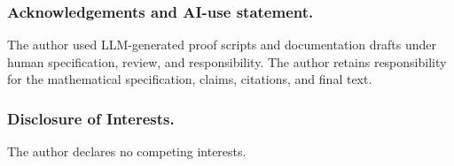 \documentclass[runningheads]{llncs}
\begin{document}
\subsubsection*{Acknowledgements and AI-use statement.}

The author used LLM-generated proof scripts and documentation drafts under
human specification, review, and responsibility. The author retains
responsibility for the mathematical specification, claims, citations, and
final text.

\subsubsection*{Disclosure of Interests.}

The author declares no competing interests.



\end{document}
